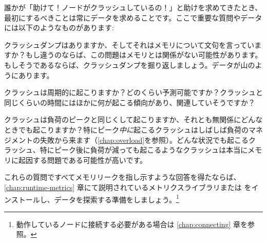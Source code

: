 誰かが「助けて！ノードがクラッシュしているの！」と助けを求めてきたとき、最初にするべきことは常にデータを求めることです。ここで重要な質問やデータには以下のようなものがあります:

\begin{itemize*}
	\item クラッシュダンプはありますか、そしてそれはメモリについて文句を言っていますか？もし違うのならば、この問題はメモリとは関係がない可能性があります。もしそうであるならば、クラッシュダンプを掘り返しましょう。データが山のようにあります。
	\item クラッシュは周期的に起こりますか？どのくらい予測可能ですか？クラッシュと同じくらいの時間にはほかに何が起こる傾向があり、関連していそうですか？
	\item クラッシュは負荷のピークと同じくして起こりますか、それとも無関係にどんなときでも起こりますか？特にピーク\emph{中に}起こるクラッシュはしばしば負荷のマネジメントの失敗から来ます（\ref{chap:overload}を参照）。どんな状況でも起こるクラッシュ、特にピーク後に負荷が減っても起こるようなクラッシュは本当にメモリに起因する問題である可能性が高いです。
\end{itemize*}

これらの質問ですべてメモリリークを指し示すような回答を得たならば、\ref{chap:runtime-metrics} 章にて説明されているメトリクスライブラリまたは  をインストールし、データを探索する準備をしましょう。\footnote{動作しているノードに接続する必要がある場合は \ref{chap:connecting} 章を参照。}

